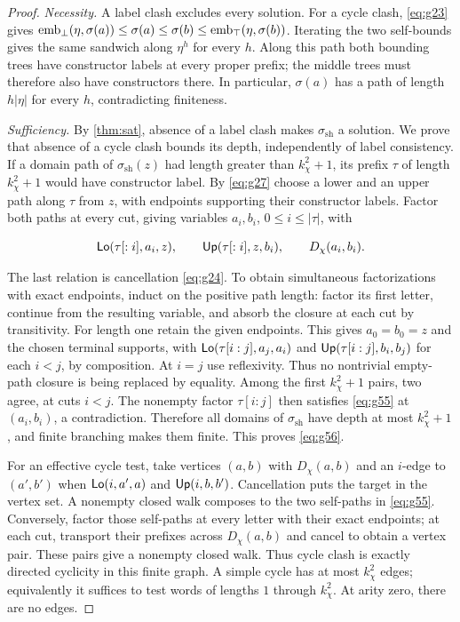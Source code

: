 \begin{proof}\emph{Necessity.} A label clash excludes every solution. For a cycle clash,
\eqref{eq:g23} gives
$\operatorname{emb}_{\bot}(\eta,\sigma(a))\le \sigma(a)\le \sigma(b)
\le\operatorname{emb}_{\top}(\eta,\sigma(b))$.
Iterating the two self-bounds gives the same sandwich along $\eta^h$
for every $h$. Along this path both bounding trees have constructor
labels at every proper prefix; the middle trees must therefore also
have constructors there. In particular, $\sigma(a)$ has a path of length
$h|\eta|$ for every $h$, contradicting finiteness.

\par\noindent\emph{Sufficiency.} By \cref{thm:sat}, absence of a label
clash makes $\sigma_{\mathrm{sh}}$ a solution. We prove that absence of a
cycle clash bounds its depth, independently of label consistency.
If a domain path of ${\sigma_{\mathrm{sh}}}(z)$ had length greater than $k_\chi^2+1$, its
prefix $\tau$ of length $k_\chi^2+1$ would have constructor label. By \eqref{eq:g27}
choose a lower and an upper path along $\tau$ from $z$, with endpoints
supporting their constructor labels. Factor both paths at every cut, giving
variables $a_i,b_i$, $0\le i\le |\tau|$, with

\begin{equation}\label{eq:g58}
\mathsf{Lo}(\tau[:i],a_i,z),\qquad
 \mathsf{Up}(\tau[:i],z,b_i),\qquad D_\chi(a_i,b_i).
\end{equation}

The last relation is cancellation \eqref{eq:g24}. To obtain simultaneous
factorizations with exact endpoints, induct on the positive path length:
factor its first letter, continue from the resulting variable, and absorb
the closure at each cut by transitivity. For length one retain the given
endpoints. This gives $a_0=b_0=z$ and the chosen terminal supports, with
$\mathsf{Lo}(\tau[i:j],a_j,a_i)$ and $\mathsf{Up}(\tau[i:j],b_i,b_j)$ for each
$i<j$, by composition. At $i=j$ use reflexivity. Thus no nontrivial
empty-path closure is being replaced by equality. Among the first $k_\chi^2+1$
pairs, two agree, at cuts $i<j$. The nonempty factor $\tau[i:j]$
then satisfies \eqref{eq:g55} at $(a_i,b_i)$, a contradiction. Therefore all
domains of ${\sigma_{\mathrm{sh}}}$ have depth at most $k_\chi^2+1$, and finite branching makes
them finite. This proves \eqref{eq:g56}.

For an effective cycle test, take vertices $(a,b)$ with $D_\chi(a,b)$
and an $i$-edge to $(a',b')$ when $\mathsf{Lo}(i,a',a)$ and $\mathsf{Up}(i,b,b')$.
Cancellation puts the target in the vertex set. A nonempty closed walk
composes to the two self-paths in \eqref{eq:g55}. Conversely, factor those
self-paths at every letter with their exact endpoints; at each cut,
transport their prefixes across $D_\chi(a,b)$ and cancel to obtain a
vertex pair. These pairs give a nonempty closed walk. Thus cycle clash is
exactly directed cyclicity in this finite graph. A simple cycle has at
most $k_\chi^2$ edges; equivalently it suffices to test words of lengths
$1$ through $k_\chi^2$. At arity zero, there are no edges.
\end{proof}

